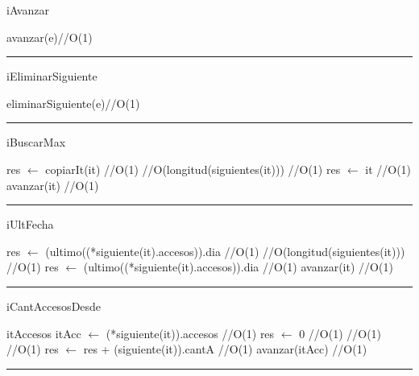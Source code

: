\begin{algorithm}[H]
\caption{iAvanzar}
\begin{algorithmic}[1]
\state avanzar(e)\hfill //O(1)
\EndFunction 
\end{algorithmic}
\hrule
{}
\end{algorithm}

\begin{algorithm}[H]
\caption{iEliminarSiguiente}
\begin{algorithmic}[1]
\state eliminarSiguiente(e)\hfill //O(1)
\EndFunction 
\end{algorithmic}
\hrule
{}
\end{algorithm}

\begin{algorithm}[H]
\caption{iBuscarMax}
\begin{algorithmic}[1]
\state res $\gets$ copiarIt(it) \hfill //O(1)
 \hfill //O(longitud(siguientes(it)))
 \hfill //O(1)
\state res $\gets$ it \hfill //O(1)
\endif
\state avanzar(it) \hfill //O(1)
\endwhile
\EndFunction 
\end{algorithmic}
\hrule
{}
\end{algorithm}

\begin{algorithm}[H]
\caption{iUltFecha}
\begin{algorithmic}[1]
\state res $\gets$ (ultimo((*siguiente(it).accesos)).dia \hfill //O(1)
 \hfill //O(longitud(siguientes(it)))
 \hfill //O(1)
\state res $\gets$ (ultimo((*siguiente(it).accesos)).dia \hfill //O(1)
\endif
\state avanzar(it) \hfill //O(1)
\endwhile
\EndFunction 
\end{algorithmic}
\hrule
{}
\end{algorithm}

\begin{algorithm}[H]
\caption{iCantAccesosDesde}
\begin{algorithmic}[1]
\state itAccesos itAcc $\gets$ (*siguiente(it)).accesos \hfill //O(1)
\state res $\gets$ 0 \hfill //O(1)
 \hfill //O(1)
 \hfill //O(1)
\state res $\gets$ res + (siguiente(it)).cantA \hfill //O(1)
\endif
\state avanzar(itAcc) \hfill //O(1)
\endwhile
\EndFunction 
\end{algorithmic}
\hrule
{}
\end{algorithm}

